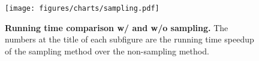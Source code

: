 \begin{figure}[!t]
  \centering
  \texttt{[image: figures/charts/sampling.pdf]}
  \caption{\textbf{Running time comparison w/ and w/o sampling.}
  The numbers at the title of each subfigure are the running time speedup of the sampling method over the non-sampling method.
  }\label{fig:exp-sampling}
\end{figure}

